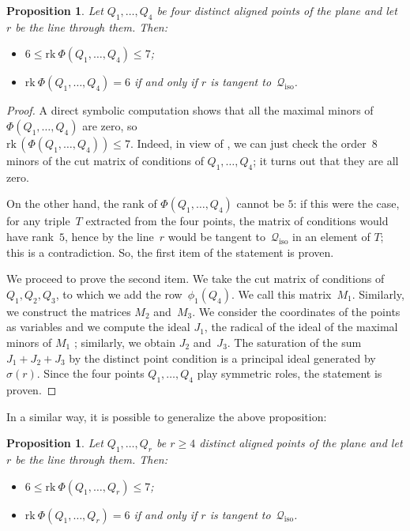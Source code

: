 \documentclass{amsart}
\theoremstyle{plain}
\newtheorem{prop}[lemma]{Proposition}
\theoremstyle{definition}
\newcommand{\iso}{\mathcal{Q}_{\mathrm{iso}}}
\newcommand{\rk}{\ensuremath{\mathrm{rk}}}
\begin{document}
\begin{prop}
\label{proposition:four_aligned}
Let $Q_1, \dotsc, Q_4$ be four distinct aligned points of the plane and
let $r$ be the line through them. Then:
\begin{itemize}
\item $6 \leq \rk  \ \Phi(Q_1, \dotsc, Q_4) \leq 7$;
\item $\rk  \ \Phi(Q_1, \dotsc, Q_4) = 6$ if and only if $r$ is tangent
to~$\iso$.
\end{itemize}
\end{prop}
\begin{proof}
  A direct symbolic computation shows that all the maximal minors of~$\Phi(Q_1, \dotsc, Q_4)$ are
  zero, so \\
  $\rk \,(\Phi(Q_1, \dotsc, Q_4)) \leq 7$.
  Indeed, in view of , we can just check the order~$8$ minors of the cut matrix of conditions of $Q_1, \dotsc, Q_4$; it turns out that they are all zero.

  On the other hand, the rank of $\Phi(Q_1, \dotsc, Q_4)$ cannot be $5$:
  if this were the case, for any triple~$T$ extracted from the four points, the matrix of conditions would have rank~$5$, hence by  the line~$r$ would be tangent to~$\iso$ in an element of $T$; this is a contradiction.
  So, the first item of the statement is proven.

  We proceed to prove the second item.
  We take the cut matrix of conditions of~$Q_1, Q_2, Q_3$, to which we add the row~$\phi_1(Q_4)$.
  We call this matrix~$M_1$.
  Similarly, we construct the matrices $M_2$ and~$M_3$.
  We consider the coordinates of the points as variables and we compute
  the ideal $J_1$, the radical of the ideal of the maximal minors of $M_1$ ; similarly, we obtain $J_2$ and~$J_3$.
  The saturation of the sum $J_1 + J_2 + J_3$ by the distinct point condition is a principal ideal generated by~$\sigma(r)$.
  Since the four points $Q_1, \dotsc, Q_4$ play symmetric roles, the statement is proven.
\end{proof}

In a similar way, it is possible to generalize the above proposition:
\begin{prop}
\label{proposition:n_aligned}
Let $Q_1, \dotsc, Q_r$ be $r\geq 4$ distinct aligned points of the plane and
let $r$ be the line through them. Then:
\begin{itemize}
\item $6 \leq \rk  \ \Phi(Q_1, \dotsc, Q_r) \leq 7$;
\item $\rk  \ \Phi(Q_1, \dotsc, Q_r) = 6$ if and only if $r$ is tangent
to~$\iso$.
\end{itemize}
\end{prop}
\end{document}
